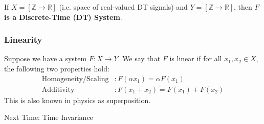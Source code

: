 If $X = [\mathbb{Z} \rightarrow \mathbb{R}]$ (i.e. space of real-valued DT signals) and $Y = [\mathbb{Z} \rightarrow \mathbb{R}]$, then \textbf{$F$ is a Discrete-Time (DT) System}.

\subsubsection{Linearity}
Suppose we have a system $F: X \rightarrow Y$. We say that $F$ is linear if for all $x_1, x_2 \in X$, the following two properties hold:
\begin{align*}
    \text{Homogeneity/Scaling} & : F(\alpha x_1) = \alpha F(x_1) \\
    \text{Additivity} & : F(x_1 + x_2) = F(x_1) + F(x_2)
\end{align*}
This is also known in physics as superposition.

Next Time:
Time Invariance
